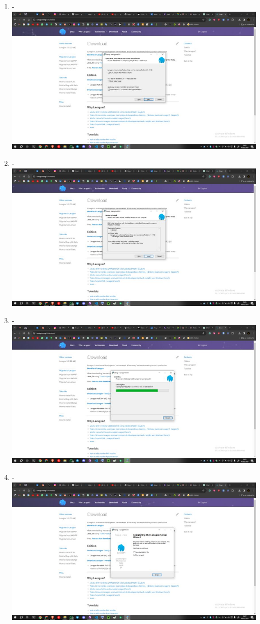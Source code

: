 \documentclass[12pt,titlepage]{article}
\begin{document}
\begin{enumerate}[label= \alph*.]
    \newpage
    \item - \\ \includegraphics[width=.9\textwidth]{images/figures/Laragon 5.jpg}
    \item - \\ \includegraphics[width=.9\textwidth]{images/figures/Laragon 6.jpg}
    \newpage
    \item - \\ \includegraphics[width=.9\textwidth]{images/figures/Laragon 7.jpg}
    \item - \\ \includegraphics[width=.9\textwidth]{images/figures/Laragon 8.jpg}

\end{enumerate}
\end{document}
